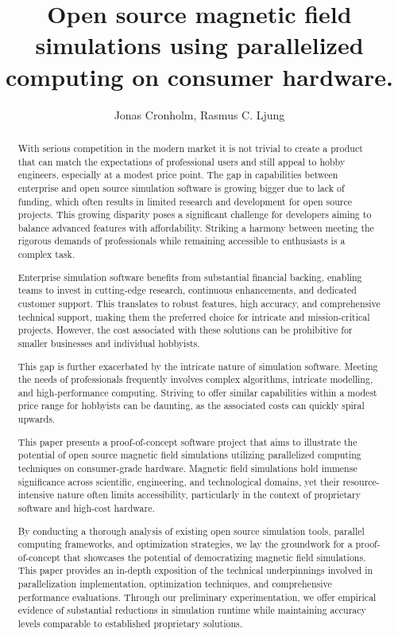 \documentclass[]{report}
\title{Open source magnetic field simulations using parallelized computing on consumer hardware.}
\author{Jonas Cronholm, Rasmus C. Ljung}
\begin{document}
\maketitle

\begin{abstract}
	
	
	With serious competition in the modern market it is not trivial to create a product that can match the expectations of professional users and still appeal to hobby engineers, especially at a modest price point. The gap in capabilities between enterprise and open source simulation software is growing bigger due to lack of funding, which often results in limited research and development for open source projects. This growing disparity poses a significant challenge for developers aiming to balance advanced features with affordability. Striking a harmony between meeting the rigorous demands of professionals while remaining accessible to enthusiasts is a complex task.
	
	Enterprise simulation software benefits from substantial financial backing, enabling teams to invest in cutting-edge research, continuous enhancements, and dedicated customer support. This translates to robust features, high accuracy, and comprehensive technical support, making them the preferred choice for intricate and mission-critical projects. However, the cost associated with these solutions can be prohibitive for smaller businesses and individual hobbyists.
	
	This gap is further exacerbated by the intricate nature of simulation software. Meeting the needs of professionals frequently involves complex algorithms, intricate modelling, and high-performance computing. Striving to offer similar capabilities within a modest price range for hobbyists can be daunting, as the associated costs can quickly spiral upwards.
	
	This paper presents a proof-of-concept software project that aims to illustrate the potential of open source magnetic field simulations utilizing parallelized computing techniques on consumer-grade hardware. Magnetic field simulations hold immense significance across scientific, engineering, and technological domains, yet their resource-intensive nature often limits accessibility, particularly in the context of proprietary software and high-cost hardware.
	
	By conducting a thorough analysis of existing open source simulation tools, parallel computing frameworks, and optimization strategies, we lay the groundwork for a proof-of-concept that showcases the potential of democratizing magnetic field simulations. This paper provides an in-depth exposition of the technical underpinnings involved in parallelization implementation, optimization techniques, and comprehensive performance evaluations. Through our preliminary experimentation, we offer empirical evidence of substantial reductions in simulation runtime while maintaining accuracy levels comparable to established proprietary solutions.
	

\end{abstract}
\end{document}
